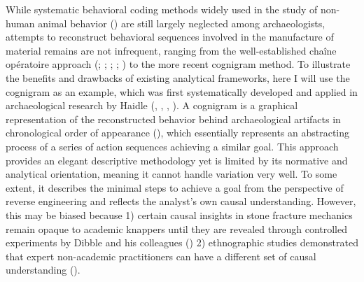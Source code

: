 \documentclass[
  11pt,
  letterpaper,
  DIV=11,
  numbers=noendperiod]{scrartcl}
\begin{document}
While systematic behavioral coding methods widely used in the study of
non-human animal behavior () are still largely neglected among archaeologists,
attempts to reconstruct behavioral sequences involved in the manufacture
of material remains are not infrequent, ranging from the
well-established chaîne opératoire approach
(;
;
;
;
) to the more recent
cognigram method. To illustrate the benefits and drawbacks of existing
analytical frameworks, here I will use the cognigram as an example,
which was first systematically developed and applied in archaeological
research by Haidle (, , ,
). A cognigram is a graphical
representation of the reconstructed behavior behind archaeological
artifacts in chronological order of appearance
(), which essentially represents
an abstracting process of a series of action sequences achieving a
similar goal. This approach provides an elegant descriptive methodology
yet is limited by its normative and analytical orientation, meaning it
cannot handle variation very well. To some extent, it describes the
minimal steps to achieve a goal from the perspective of reverse
engineering and reflects the analyst's own causal understanding.
However, this may be biased because 1) certain causal insights in stone
fracture mechanics remain opaque to academic knappers until they are
revealed through controlled experiments by Dibble and his colleagues
() 2) ethnographic studies
demonstrated that expert non-academic practitioners can have a different
set of causal understanding ().
\end{document}
